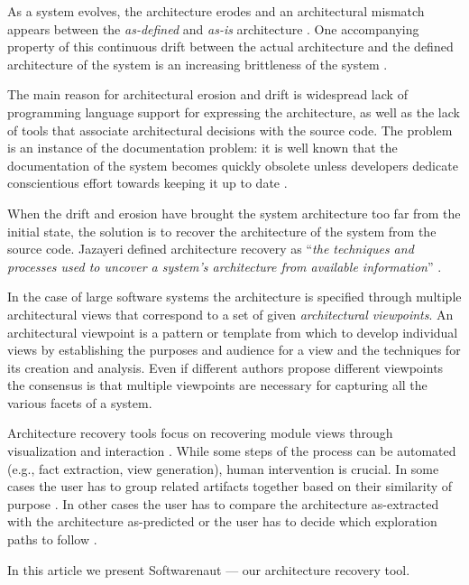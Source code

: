 \documentclass[preprint,12pt]{elsarticle}
\begin{document}
As a system evolves, the architecture erodes \cite{perry-foundations} and an architectural mismatch appears between the {\em as-defined} and {\em as-is} architecture \cite{garlan-mismatch}. One accompanying property of this continuous drift between the actual architecture and the defined architecture of the system is an increasing brittleness of the system \cite{perry-foundations}. 

The main reason for architectural erosion and drift is widespread lack of programming language support for expressing the architecture, as well as the lack of tools that associate architectural decisions with the source code. The problem is an instance of the documentation problem: it is well known that the documentation of the system becomes quickly obsolete unless developers dedicate conscientious effort towards keeping it up to date \cite{riva-report}.

When the drift and erosion have brought the system architecture too far from the initial state, the solution is to recover the architecture of the system from the source code. Jazayeri defined architecture recovery as ``{\em the techniques and processes used to uncover a system's architecture from available information}'' \cite{jaza-archevo}. 

In the case of large software systems the architecture is specified through multiple architectural views that correspond to a set of given {\em architectural viewpoints}. An architectural viewpoint is a pattern or template from which to develop individual views by establishing the purposes and audience for a view and the techniques for its creation and analysis. Even if different authors propose different viewpoints \cite{bass-architecture, kruchten-4plus, hof-apparch} the consensus is that multiple viewpoints are necessary for capturing all the various facets of a system.

Architecture recovery tools focus on recovering module views through visualization and interaction \cite{murphy-reflexion, muller-rigi, storey-shrimp}. While some steps of the process can be automated (e.g., fact extraction, view generation), human intervention is crucial. In some cases the user has to group related artifacts together based on their similarity of purpose \cite{muller-rigi}. In other cases the user has to compare the architecture as-extracted with the architecture as-predicted \cite{murphy-reflexion} or the user has to decide which exploration paths to follow \cite{storey-shrimp}.

In this article we present Softwarenaut --- our architecture recovery tool.
\end{document}
